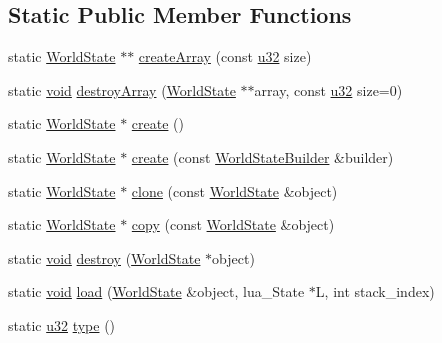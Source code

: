 \subsection*{Static Public Member Functions}
\begin{DoxyCompactItemize}
\item 
static \mbox{\hyperlink{classnjli_1_1_world_state}{World\+State}} $\ast$$\ast$ \mbox{\hyperlink{classnjli_1_1_world_state_a1db73165c58d1b8d509129c18346b457}{create\+Array}} (const \mbox{\hyperlink{_util_8h_a10e94b422ef0c20dcdec20d31a1f5049}{u32}} size)
\item 
static \mbox{\hyperlink{_thread_8h_af1e856da2e658414cb2456cb6f7ebc66}{void}} \mbox{\hyperlink{classnjli_1_1_world_state_ae8c65d0545df866ff59c6f197aa42707}{destroy\+Array}} (\mbox{\hyperlink{classnjli_1_1_world_state}{World\+State}} $\ast$$\ast$array, const \mbox{\hyperlink{_util_8h_a10e94b422ef0c20dcdec20d31a1f5049}{u32}} size=0)
\item 
static \mbox{\hyperlink{classnjli_1_1_world_state}{World\+State}} $\ast$ \mbox{\hyperlink{classnjli_1_1_world_state_a4314a91c41dcb4b3418cc6e077c9b191}{create}} ()
\item 
static \mbox{\hyperlink{classnjli_1_1_world_state}{World\+State}} $\ast$ \mbox{\hyperlink{classnjli_1_1_world_state_a863bd5c20a3d3f9f62844ecf2c911099}{create}} (const \mbox{\hyperlink{classnjli_1_1_world_state_builder}{World\+State\+Builder}} \&builder)
\item 
static \mbox{\hyperlink{classnjli_1_1_world_state}{World\+State}} $\ast$ \mbox{\hyperlink{classnjli_1_1_world_state_a4ba8555951541584e30d1017f3f67a6c}{clone}} (const \mbox{\hyperlink{classnjli_1_1_world_state}{World\+State}} \&object)
\item 
static \mbox{\hyperlink{classnjli_1_1_world_state}{World\+State}} $\ast$ \mbox{\hyperlink{classnjli_1_1_world_state_a626f51bba8f527cfeaafdfa39ad02a5e}{copy}} (const \mbox{\hyperlink{classnjli_1_1_world_state}{World\+State}} \&object)
\item 
static \mbox{\hyperlink{_thread_8h_af1e856da2e658414cb2456cb6f7ebc66}{void}} \mbox{\hyperlink{classnjli_1_1_world_state_a0dda0636635a1086b85a04bba007e6e2}{destroy}} (\mbox{\hyperlink{classnjli_1_1_world_state}{World\+State}} $\ast$object)
\item 
static \mbox{\hyperlink{_thread_8h_af1e856da2e658414cb2456cb6f7ebc66}{void}} \mbox{\hyperlink{classnjli_1_1_world_state_ad8dd1637df165f9886d11c3e8b6d1cb7}{load}} (\mbox{\hyperlink{classnjli_1_1_world_state}{World\+State}} \&object, lua\+\_\+\+State $\ast$L, int stack\+\_\+index)
\item 
static \mbox{\hyperlink{_util_8h_a10e94b422ef0c20dcdec20d31a1f5049}{u32}} \mbox{\hyperlink{classnjli_1_1_world_state_a2180d81af9c682241e46530078272537}{type}} ()
\end{DoxyCompactItemize}
